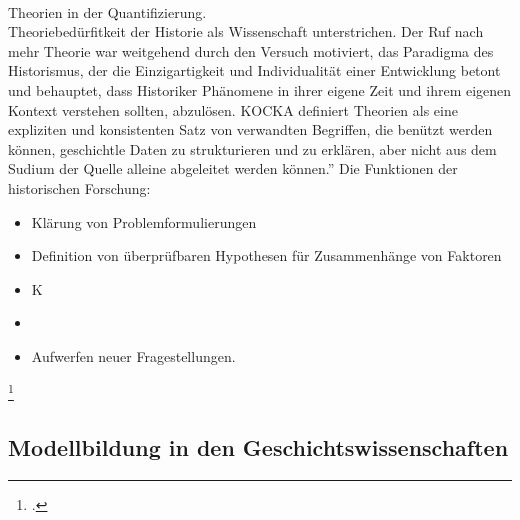 \documentclass[12pt,a4paper]{article}
\begin{document}
\\
Theorien in der Quantifizierung.
\\
Theoriebedürfitkeit der Historie als Wissenschaft unterstrichen. Der Ruf nach mehr Theorie war weitgehend durch den Versuch motiviert, das Paradigma des Historismus, der die Einzigartigkeit und Individualität einer Entwicklung betont und behauptet, dass Historiker Phänomene in ihrer eigene Zeit und ihrem eigenen Kontext verstehen sollten, abzulösen. KOCKA definiert Theorien als eine expliziten und konsistenten Satz von verwandten Begriffen, die benützt werden können, geschichtle Daten zu strukturieren und zu erklären, aber nicht aus dem Sudium der Quelle alleine abgeleitet werden können.'' Die Funktionen der historischen Forschung:
\begin{itemize}
\item Klärung von Problemformulierungen
\item Definition von überprüfbaren Hypothesen für Zusammenhänge von Faktoren 
\item K
\item 
\item Aufwerfen neuer Fragestellungen.
\end{itemize}
\footcite[][S.182-191]{jarausch1985quantitative}

\subsection{Modellbildung in den Geschichtswissenschaften}
\end{document}
